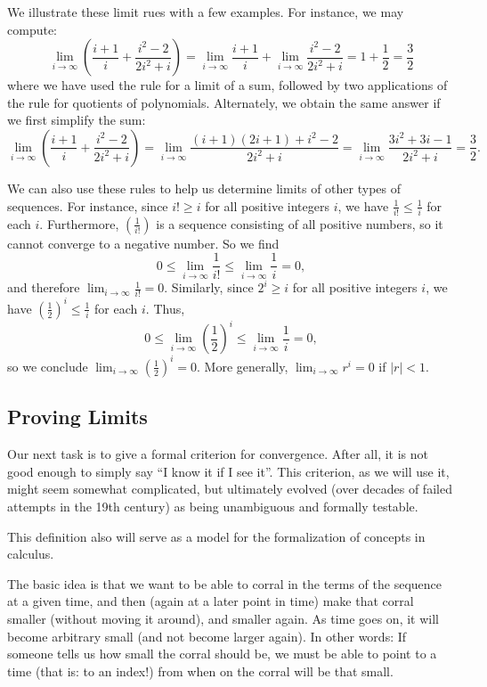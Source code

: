 We illustrate these limit rues with a few examples.
For instance, we may compute:
\[
\lim_{i \to \infty} \left( \frac{i+1}{i} + \frac{i^2-2}{2i^2+i} \right)
= \lim_{i \to \infty}  \frac{i+1}{i} + \lim_{i \to \infty} \frac{i^2-2}{2i^2+i}
= 1 + \frac{1}{2}
= \frac{3}{2}
\]
where we have used the rule for a limit of a sum, followed by two applications of the rule for quotients of polynomials.
Alternately, we obtain the same answer if we first simplify the sum:
\[
\lim_{i \to \infty} \left( \frac{i+1}{i} + \frac{i^2-2}{2i^2+i} \right)
= \lim_{i \to \infty} \frac{(i+1)(2i+1)+i^2-2}{2i^2+i}
= \lim_{i \to \infty} \frac{3i^2+3i-1}{2i^2+i}
=\frac{3}{2}.
\]

We can also use these rules to help us determine limits of other types of sequences.
For instance, since $i! \geq i$ for all positive integers $i$, we have $\frac{1}{i!} \leq \frac{1}{i}$ for each $i$.
Furthermore, $\left( \frac{1}{i!} \right)$ is a sequence consisting of all positive numbers, so it cannot converge to a negative number.
So we find
\[
0 \leq \lim_{i \to \infty} \frac{1}{i!} \leq \lim_{i \to \infty} \frac{1}{i} = 0,
\]
and therefore $\lim_{i \to \infty} \frac{1}{i!} = 0$.
Similarly, since $2^i \geq i$ for all positive integers $i$, we have $\left(\frac{1}{2}\right)^i \leq \frac{1}{i}$ for each $i$.
Thus,
\[
0 \leq \lim_{i \to \infty} \left(\frac{1}{2}\right)^i \leq \lim_{i \to \infty} \frac{1}{i} = 0,
\]
so we conclude $\lim_{i \to \infty} \left(\frac{1}{2}\right)^i = 0$.
More generally, $\lim_{i \to \infty} r^i = 0$ if $|r|<1$.

\subsection{Proving Limits}

Our next task is to give a formal criterion for convergence. After all, it is not good
enough to simply say ``I know it if I see it''. This criterion, as we will use it, might
seem somewhat complicated, but ultimately evolved (over decades of failed attempts in the
19th century) as being unambiguous and formally testable.

This definition also will serve as a model for the formalization of concepts in calculus.
\medskip

The basic idea is that we want to be able to corral in the terms of the
sequence at a given time, and then (again at a
later point in time) make that corral smaller (without moving it around), and
smaller again.  As time goes on, it will become arbitrary small (and not
become larger again).  In other words: If someone tells us how small the
corral should be, we must be able to point to a time (that is: to an index!)
from when on the corral will be that small.

